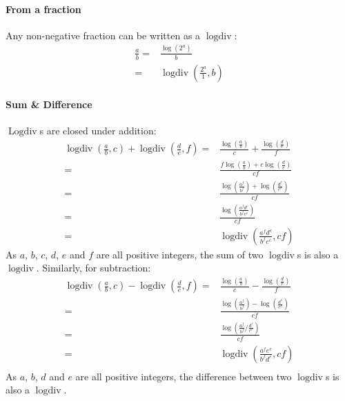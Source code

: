 \documentclass{article}
\DeclareMathOperator{\logdiv}{logdiv}
\DeclareMathOperator{\Logdiv}{Logdiv}
\begin{document}
            \paragraph{From a fraction}
                Any non-negative fraction can be written as a $\logdiv$:
                \begin{align*}
                    \frac{a}{b} ={}& \frac{\log(2^a)}{b} \\
                    {}={}& \logdiv(\frac{2^a}{1}, b)
                \end{align*}
    
            \paragraph{Sum \& Difference}
                $\Logdiv$s are closed under addition:
                \begin{align*}
                    \logdiv(\frac{a}{b}, c) + \logdiv(\frac{d}{e}, f) = {}& 
                    \frac{\log(\frac{a}{b})}{c} + \frac{\log(\frac{d}{e})}{f}\\
                    {}={}& \frac{f\log(\frac{a}{b}) + c\log(\frac{d}{e})}{cf}\\
                    {}={}& \frac{\log(\frac{a^f}{b^f}) + \log(\frac{d^c}{e^c})}{cf}\\
                    {}={}& \frac{\log(\frac{a^f d^c}{b^f e^c})}{cf}\\
                    {}={}& \logdiv(\frac{a^f d^c}{b^f e^c}, cf)
                \end{align*}
                As $a$, $b$, $c$, $d$, $e$ and $f$ are all positive integers, the sum of two $\logdiv$s is also a $\logdiv$.
                Similarly, for subtraction:
                \begin{align*}
                    \logdiv(\frac{a}{b}, c) - \logdiv(\frac{d}{e}, f) = {}& 
                    \frac{\log(\frac{a}{b})}{c} - \frac{\log(\frac{d}{e})}{f}\\
                    {}={}& \frac{\log(\frac{a^f}{b^f}) - \log(\frac{d^c}{e^c})}{cf}\\
                    {}={}& \frac{\log(\frac{a^f}{b^f} / \frac{d^c}{e^c})}{cf}\\
                    {}={}& \logdiv(\frac{a^f e^c}{b^f d^c}, cf)\\
                \end{align*}
                As $a$, $b$, $d$ and $e$ are all positive integers, the difference between two $\logdiv$s is also a $\logdiv$.
\end{document}
